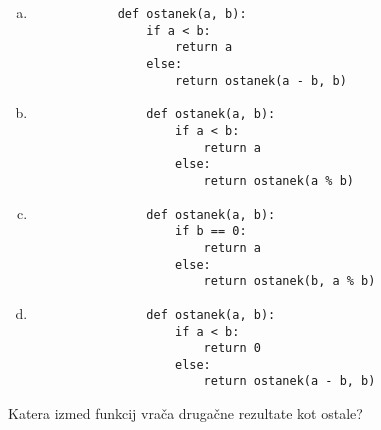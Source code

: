 \documentclass[arhiv, 10pt]{../izpit}
\begin{document}
        \begin{multicols}{2}
        \begin{enumerate}[(a)]
\item 
            \begin{verbatim}
            def ostanek(a, b):
                if a < b:
                    return a
                else:
                    return ostanek(a - b, b)
            \end{verbatim}
        
\item 
                \begin{verbatim}
                def ostanek(a, b):
                    if a < b:
                        return a
                    else:
                        return ostanek(a % b)
                \end{verbatim}
            
\item 
                \begin{verbatim}
                def ostanek(a, b):
                    if b == 0:
                        return a
                    else:
                        return ostanek(b, a % b)
                \end{verbatim}
            
\item 
                \begin{verbatim}
                def ostanek(a, b):
                    if a < b:
                        return 0
                    else:
                        return ostanek(a - b, b)
                \end{verbatim}
            
\end{enumerate}

        \end{multicols}
    
        \naloga*
        
        Katera izmed funkcij vrača drugačne rezultate kot ostale?
    
\end{document}
